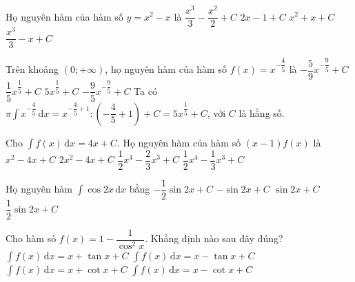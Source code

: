 \begin{ex}%
	Họ nguyên hàm của hàm số $y = x^2 - x$ là
	\choice
	{\True $\dfrac{x^3}{3} - \dfrac{x^2}{2} + C$}
	{$2x - 1 + C$}
	{$x^2 + x + C$}
	{$\dfrac{x^3}{3} - x + C$}
\end{ex}

\begin{ex}%
	Trên khoảng $\left(0; +\infty \right)$, họ nguyên hàm của hàm số $f(x) = x^{-\dfrac{4}{5}}$ là
	\choice
	{$-\dfrac{5}{9}x^{-\dfrac{9}{5}} + C$}
	{$\dfrac{1}{5}x^{\dfrac{1}{5}} + C$}
	{\True $5x^{\dfrac{1}{5}} + C$}
	{$-\dfrac{9}{5}x^{-\dfrac{9}{5}} + C$}
	\loigiai
	{Ta có $\pi\displaystyle\int\limits x^{-\dfrac{4}{5}}\mathrm{\,d}x = x^{-\dfrac{4}{5} + 1} : \left(-\dfrac{4}{5} + 1 \right) + C = 5x^{\dfrac{1}{5}} + C$, với $C$ là hằng số.
	}
\end{ex}

\begin{ex}%
	Cho $\displaystyle\int\limits f(x){\mathrm{\,d}}x=4x+C$. Họ nguyên hàm của hàm số $(x-1)f(x)$ là
	\choice
	{$x^{2}-4x+C$}
	{\True $2x^{2}-4x+C$}
	{$\dfrac{1}{2}x^{4}-\dfrac{2}{3}x^{3}+C$}
	{$\dfrac{1}{2}x^{4}-\dfrac{1}{3}x^{3}+C$}
\end{ex}

\begin{ex}%
	Họ nguyên hàm $\displaystyle\int\limits \cos 2x\mathrm{\,d}x$ bằng
	\choice
	{$-\dfrac{1}{2}\sin 2x+C$}
	{$-\sin 2x+C$}
	{$\sin 2x+C$}
	{\True $\dfrac{1}{2}\sin 2x+C$}
\end{ex}

%

\begin{ex}%
	Cho hàm số $f(x)=1-\dfrac{1}{\cos ^2 x}$. Khẳng định nào sau đây đúng?
	\choice
	{$\displaystyle\int f(x) \mathrm{\,d}x=x+\tan x+C$}
	{\True $\displaystyle\int f(x) \mathrm{\,d}x=x-\tan x+C$}
	{$\displaystyle\int f(x) \mathrm{\,d}x=x+\cot x+C$}
	{$\displaystyle\int f(x) \mathrm{\,d}x=x-\cot x+C$}
\end{ex}

